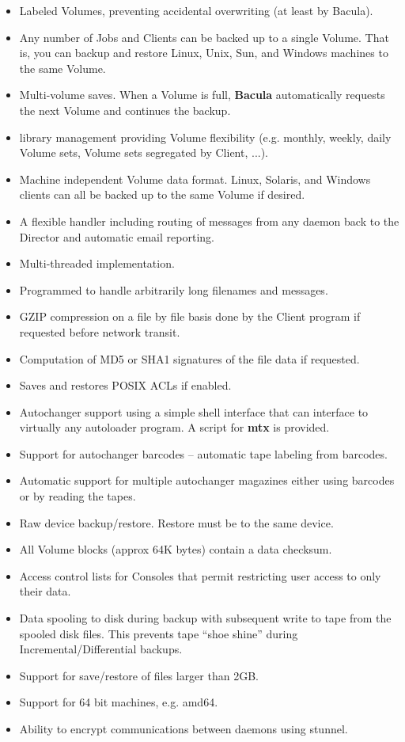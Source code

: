 \begin{itemize}
\item Labeled Volumes, preventing accidental overwriting  (at least by
   Bacula).  
\item Any number of Jobs and Clients can be backed up to a single  Volume.
   That is, you can backup and restore Linux, Unix, Sun, and  Windows machines to
   the same Volume.  
\item Multi-volume saves. When a Volume is full, {\bf Bacula}  automatically
   requests the next Volume and continues the backup.  
\item 
    library management 
   providing Volume flexibility (e.g. monthly, weekly, daily Volume sets,  Volume
   sets segregated by Client, ...). 
\item Machine independent Volume data format. Linux, Solaris, and Windows 
   clients can all be backed up to the same Volume if desired. 
\item A flexible 
     handler including routing
   of messages from any daemon back to the  Director and automatic email
   reporting.  
\item Multi-threaded implementation.  
\item Programmed to handle arbitrarily long filenames and messages.  
\item GZIP compression on a file by file basis done by the Client program  if
   requested before network transit.  
\item Computation of MD5 or SHA1 signatures of the file data if requested.  
\item Saves and restores POSIX ACLs if enabled.  
\item Autochanger support using a simple shell interface that can interface 
   to virtually any autoloader program. A script for {\bf mtx} is  provided.  
\item Support for autochanger barcodes -- automatic tape labeling from 
   barcodes.  
\item Automatic support for multiple autochanger magazines either using
   barcodes or by reading the tapes.  
\item Raw device backup/restore. Restore must be to the same device. 
\item All Volume blocks (approx 64K bytes) contain a data checksum.  
\item Access control lists for Consoles that permit restricting user  access
   to only their data.  
\item Data spooling to disk during backup with subsequent write to tape  from
   the spooled disk files. This prevents tape ``shoe shine''  during
   Incremental/Differential backups.  
\item Support for save/restore of files larger than 2GB.  
\item Support for 64 bit machines, e.g. amd64.  
\item Ability to encrypt communications between daemons using stunnel. 
   \end{itemize}

